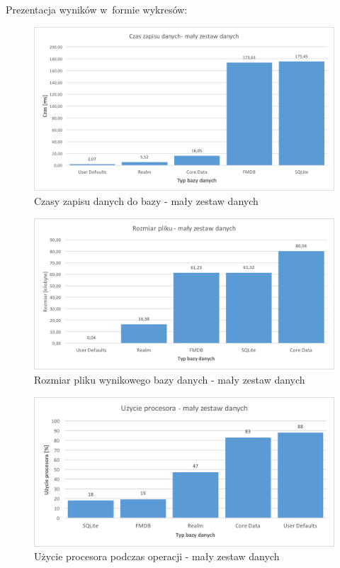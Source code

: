 \newpage
Prezentacja wyników w~formie wykresów: 

\begin{figure}[h]
\centering
	\includegraphics[width=15cm]{img/save_data/save_speed_small.png}
	\caption{Czasy zapisu danych do bazy - mały zestaw danych}
	\label{fig: small-save-time}
\end{figure}

\begin{figure}[h]
\centering
	\includegraphics[width=15cm]{img/save_data/save_file_small.png}
	\caption{Rozmiar pliku wynikowego bazy danych - mały zestaw danych}
	\label{fig: small-save-file-size}
\end{figure}

\newpage

\begin{figure}[h]
\centering
	\includegraphics[width=15cm]{img/save_data/save_cpu_small.png}
	\caption{Użycie procesora podczas operacji - mały zestaw danych}
	\label{fig: small-save-cpu}
\end{figure}

